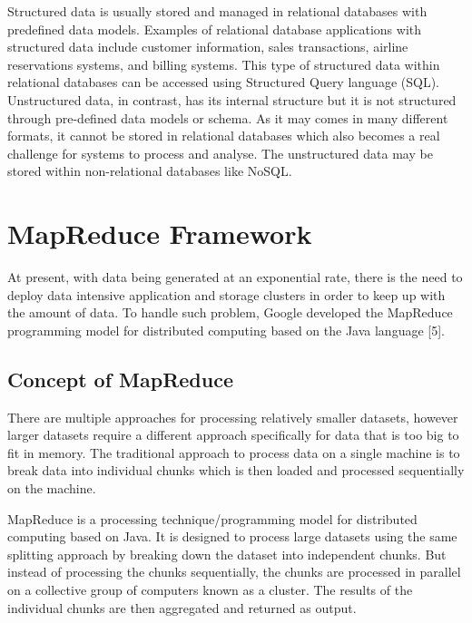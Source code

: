 \documentclass[11pt]{book}
\begin{document}
Structured data is usually stored and managed in relational databases with predefined data models. Examples of relational database applications with structured data include customer information, sales transactions, airline reservations systems, and billing systems. This type of structured data within relational databases can be accessed using Structured Query language (SQL).\\
 
Unstructured data, in contrast, has its internal structure but it is not structured through pre-defined data models or schema. As it may comes in many different formats, it cannot be stored in relational databases which also becomes a real challenge for systems to process and analyse. The unstructured data may be stored within non-relational databases like NoSQL.

\chapter{MapReduce Framework}

At present, with data being generated at an exponential rate, there is the need to deploy data intensive application and storage clusters in order to keep up with the amount of data. To handle such problem, Google developed the MapReduce programming model for distributed computing based on the Java language [5].

\section{Concept of MapReduce}

There are multiple approaches for processing relatively smaller datasets, however larger datasets require a different approach specifically for data that is too big to fit in memory. The traditional approach to process data on a single machine is to break data into individual chunks which is then loaded and processed sequentially on the machine. 

MapReduce is a processing technique/programming model for distributed computing based on Java. It is designed to process large datasets using the same splitting approach by breaking down the dataset into independent chunks. But instead of processing the chunks sequentially, the chunks are processed in parallel on a collective group of computers known as a cluster. The results of the individual chunks are then aggregated and returned as output.\\
\end{document}

